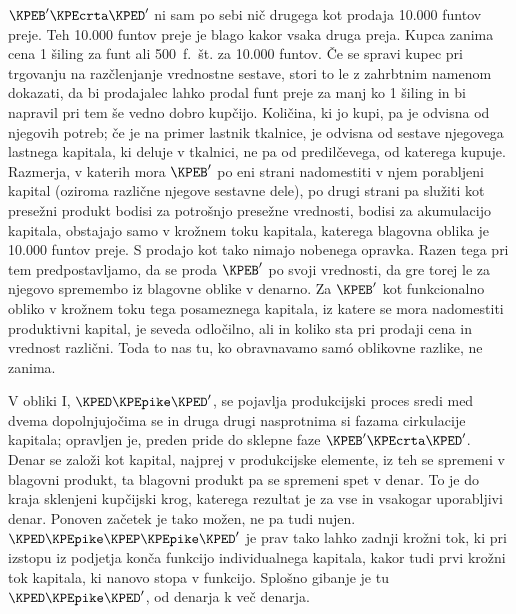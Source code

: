 \documentclass[kapital_02.tex]{subfiles}
\begin{document}
\( \KPEB' \KPEcrta \KPED' \) ni sam po sebi nič drugega kot prodaja 10.000 funtov preje. Teh 10.000 funtov preje je blago kakor vsaka druga preja. Kupca zanima cena 1 šiling za funt ali 500~f.~št. za 10.000 funtov. Če se spravi kupec pri trgovanju na razčlenjanje vrednostne sestave, stori to le z zahrbtnim namenom dokazati, da bi prodajalec lahko prodal funt preje za manj ko 1 šiling in bi napravil pri tem še vedno dobro kupčijo. Količina, ki jo kupi, pa je odvisna od njegovih potreb; če je na primer lastnik tkalnice, je odvisna od sestave njegovega lastnega kapitala, ki deluje v tkalnici, ne pa od predilčevega, od katerega kupuje. Razmerja, v katerih mora \( \KPEB' \) po eni strani nadomestiti v njem porabljeni kapital (oziroma različne njegove sestavne dele), po drugi strani pa služiti kot presežni produkt bodisi za potrošnjo presežne vrednosti, bodisi za akumulacijo kapitala, obstajajo samo v krožnem toku kapitala, katerega blagovna oblika je 10.000 funtov preje. S prodajo kot tako nimajo nobenega opravka. Razen tega pri tem predpostavljamo, da se proda \( \KPEB' \) po svoji vrednosti, da gre torej le za njegovo spremembo iz blagovne oblike v denarno. Za \( \KPEB' \) kot funkcionalno obliko v krožnem toku tega posameznega kapitala, iz katere se mora nadomestiti produktivni kapital, je seveda odločilno, ali in koliko sta pri prodaji cena in vrednost različni. Toda to nas tu, ko obravnavamo sam\'o oblikovne razlike, ne zanima.

V \KPEstran obliki I, \( \KPED \KPEpike \KPED' \), se pojavlja produkcijski proces sredi med dvema dopolnjujočima se in druga drugi nasprotnima si fazama cirkulacije kapitala; opravljen je, preden pride do sklepne faze \( \KPEB' \KPEcrta \KPED' \). Denar se založi kot kapital, najprej v produkcijske elemente, iz teh se spremeni v blagovni produkt, ta blagovni produkt pa se spremeni spet v denar. To je do kraja sklenjeni kupčijski krog, katerega rezultat je za vse in vsakogar uporabljivi denar. Ponoven začetek je tako možen, ne pa tudi nujen. \( \KPED \KPEpike \KPEP \KPEpike \KPED' \) je prav tako lahko zadnji krožni tok, ki pri izstopu iz podjetja konča funkcijo individualnega kapitala, kakor tudi prvi krožni tok kapitala, ki nanovo stopa v funkcijo. Splošno gibanje je tu \( \KPED \KPEpike \KPED' \), od denarja k več denarja.
\end{document}
